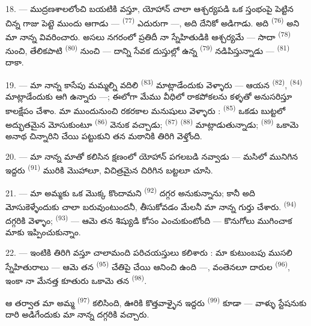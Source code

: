\VUsaut{3.0mm}

18. --- ముద్రణశాలలోంచి బయటికి వస్తూ, యోహాన్ చాలా ఆశ్చర్యపడి ఒక స్తంభంపై పెట్టిన చిన్న గాజు
పెట్టె ముందు ఆగాడు —  \textsuperscript{(77)} ఎదురుగా —, అది
దేనికో అడిగాడు. అది  \textsuperscript{(76)} అని మా నాన్న
వివరించారు. అసలు నగరంలో ప్రతిదీ నా స్నేహితుడికి ఆశ్చర్యమే — సాదా
 \textsuperscript{(78)} నుంచి, తేలికపాటి
 \textsuperscript{(80)} నుంచి — దాన్ని సేవక దుస్తుల్లో ఉన్న
 \textsuperscript{(79)} నడిపిస్తున్నాడు — 
\textsuperscript{(81)} దాకా.

19. --- మా నాన్న కాసేపు మమ్మల్ని వదిలి 
\textsuperscript{(83)} మాట్లాడేందుకు వెళ్ళారు — ఆయన 
\textsuperscript{(82)},  \textsuperscript{(84)} మాట్లాడేందుకు ఆగి
ఉన్నారు —; ఈలోగా మేము వీధిలో రాకపోకలను కళ్ళతో అనుసరిస్తూ కాలక్షేపం చేశాం. మా ముందునుంచి
రకరకాల మనుషులు వెళ్ళారు :  \textsuperscript{(85)} ఒకడు బుట్టలో
అద్భుతమైన  మోసుకుంటూ 
\textsuperscript{(86)} వెనుక వచ్చాడు;  \textsuperscript{(87)}
 \textsuperscript{(88)} మాట్లాడుతున్నాడు; 
\textsuperscript{(89)} ఒకామె అనాథ చిన్నారిని చేయి పట్టుకుని తన మఠానికి తిరిగి వెళ్తోంది.

\VUsaut{3.0mm}

20. --- మా నాన్న మాతో కలిసిన క్షణంలో యోహాన్ పగలబడి నవ్వాడు — మసిలో మునిగిన ఇద్దరు
 \textsuperscript{(91)} మురికి మొహాలూ, విచిత్రమైన చిరిగిన
బట్టలూ చూసి.

21. --- మా అమ్మకు ఒక మొక్క కొందామని  \textsuperscript{(92)} దగ్గర
అనుకున్నాను; కానీ అది మోసుకెళ్ళేందుకు చాలా బరువుంటుందనీ, 
తీసుకోవడం మేలనీ మా నాన్న గుర్తు చేశారు.  \textsuperscript{(94)}
దగ్గరికి వెళ్ళాం;  \textsuperscript{(93)} — ఆమె తన శిష్యుడి
కోసం ఎంచుకుంటోంది — కొనుగోలు ముగించాక మాకు ఇప్పించుకున్నాం.

22. --- ఇంటికి తిరిగి వస్తూ చాలామంది పరిచయస్తులు కలిశారు : మా కుటుంబపు ముసలి
స్నేహితురాలు — ఆమె తన  \textsuperscript{(95)} చేతిపై చేయి ఆనించి ఉంది —,
వంతెనలూ దారుల  \textsuperscript{(96)}, ఇంకా నా మేనత్త కూతురు ఒకామె తన
 \textsuperscript{(98)}.

ఆ తర్వాత మా అమ్మ  \textsuperscript{(97)} కలిసింది, ఊరికి
కొత్తవాళ్ళైన ఇద్దరు  \textsuperscript{(99)} కూడా — వాళ్ళు స్టేషనుకు దారి
అడిగేందుకు మా నాన్న దగ్గరికి వచ్చారు.

\VUsaut{6.0mm}
\VUfilet{22mm}
